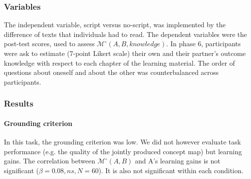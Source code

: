 \documentclass[natbib]{svjour3}
\newcommand{\eg}{e.g.\xspace}
\newcommand{\A}{A\xspace}
\newcommand{\M}[3]{{\mathcal{M}(#1, #2, #3)}}
\newcommand{\Model}[3]{{$\mathcal{M}^{\circ}(#1, #2, #3)$}}
\newcommand{\gModel}[2]{{$\mathcal{M}^{\circ}(#1, #2)$}}
\newcommand{\Mdeg}[3]{{\mathcal{M}^{\circ}(#1, #2, #3)}}
\begin{document}
\subsubsection*{Variables}

The independent variable, script versus no-script, was implemented by the
difference of texts that individuals had to read.  The dependent variables were
the post-test scores, used to assess \Model{A}{B}{knowledge}. In phase 6,
participants were ask to estimate (7-point Likert scale) their own and their
partner's outcome knowledge with respect to each chapter of the learning
material. The order of questions about oneself and about the other was
counterbalanced across participants. 
%
%
%

\subsubsection*{Results}

\paragraph{Grounding criterion} In this task, the grounding criterion was low.
We did not however evaluate task performance (\eg the quality of the jointly
produced concept map) but learning gains. The correlation between \gModel{A}{B}
and \A's learning gains is not significant ($\beta = 0.08, ns, N = 60$). It is
also not significant within each condition.
\end{document}

